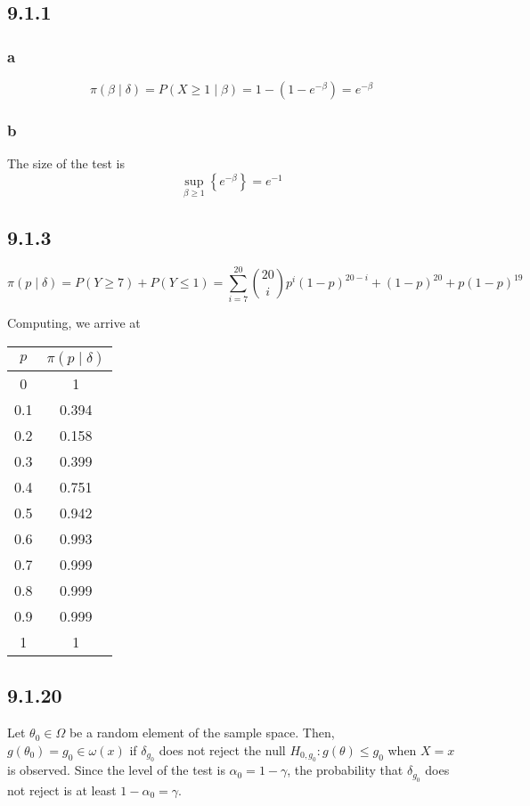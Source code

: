 \documentclass[12pt,letterpaper]{article}
\theoremstyle{definition}
\begin{document}
\subsection*{9.1.1}

\subsubsection*{a}
\[
  \pi(\beta \mid \delta) = P(X \geq 1\mid \beta) = 1 - (1 - e^{-\beta}) = e^{-\beta}
\]

\subsubsection*{b}

The size of the test is
\[
  \sup_{\beta \geq 1}\left\{ e^{-\beta} \right\} = e^{-1}
\]

\subsection*{9.1.3}

\[
  \pi(p \mid \delta) = P(Y \geq 7) + P(Y \leq 1) =
  \sum_{i=7}^{20}\binom{20}{i}p^i(1-p)^{20-i}  + (1-p)^{20} + p(1-p)^{19}
\]

Computing, we arrive at

\begin{center}
\begin{tabular}{c|c}
  $p$ & $\pi(p \mid \delta)$ \\
  \hline
  0 & 1 \\
  0.1 & 0.394 \\
  0.2 & 0.158 \\
  0.3 & 0.399 \\
  0.4 & 0.751 \\
  0.5 & 0.942 \\
  0.6 & 0.993 \\
  0.7 & 0.999 \\
  0.8 & 0.999 \\
  0.9 & 0.999 \\
  1 & 1
\end{tabular}
\end{center}

\subsection*{9.1.20}

Let $\theta_0 \in \Omega$ be a random element of the sample space. Then,
$g(\theta_0) = g_0 \in \omega(x)$ if $\delta_{g_0}$ does not reject the null
$H_{0,g_0}: g(\theta) \leq g_0$ when $X = x$ is observed. Since the level of the test is $\alpha_0 = 1 -
\gamma$, the probability that $\delta_{g_0}$ does not reject is at least $1 -
\alpha_0 = \gamma$.
\end{document}
